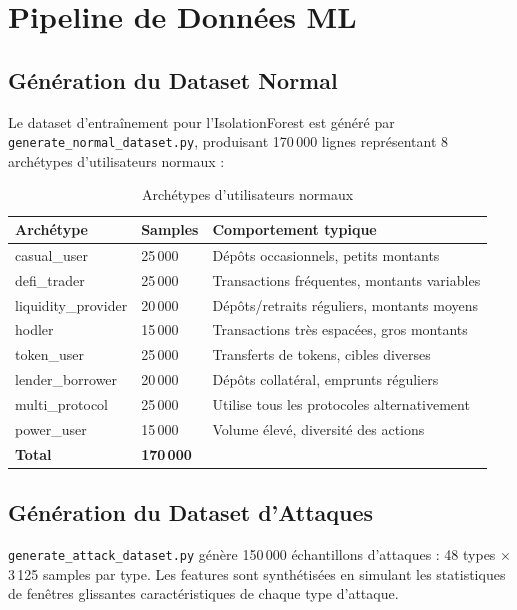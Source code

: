 \documentclass[12pt,a4paper]{report}
\newcommand{\code}[1]{\texttt{#1}}
\begin{document}
\section{Pipeline de Données ML}

\subsection{Génération du Dataset Normal}

Le dataset d'entraînement pour l'IsolationForest est généré par \code{generate\_normal\_dataset.py}, produisant 170\,000 lignes représentant 8 archétypes d'utilisateurs normaux :

\begin{table}[H]
\centering
\caption{Archétypes d'utilisateurs normaux}
\label{tab:normal_archetypes}
\begin{tabularx}{\linewidth}{L{4cm} C{2cm} L{7cm}}
\toprule
\textbf{Archétype} & \textbf{Samples} & \textbf{Comportement typique} \\
\midrule
casual\_user & 25\,000 & Dépôts occasionnels, petits montants \\
defi\_trader & 25\,000 & Transactions fréquentes, montants variables \\
liquidity\_provider & 20\,000 & Dépôts/retraits réguliers, montants moyens \\
hodler & 15\,000 & Transactions très espacées, gros montants \\
token\_user & 25\,000 & Transferts de tokens, cibles diverses \\
lender\_borrower & 20\,000 & Dépôts collatéral, emprunts réguliers \\
multi\_protocol & 25\,000 & Utilise tous les protocoles alternativement \\
power\_user & 15\,000 & Volume élevé, diversité des actions \\
\midrule
\textbf{Total} & \textbf{170\,000} & \\
\bottomrule
\end{tabularx}
\end{table}

\subsection{Génération du Dataset d'Attaques}

\code{generate\_attack\_dataset.py} génère 150\,000 échantillons d'attaques : 48 types $\times$ 3\,125 samples par type. Les features sont synthétisées en simulant les statistiques de fenêtres glissantes caractéristiques de chaque type d'attaque.
\end{document}
